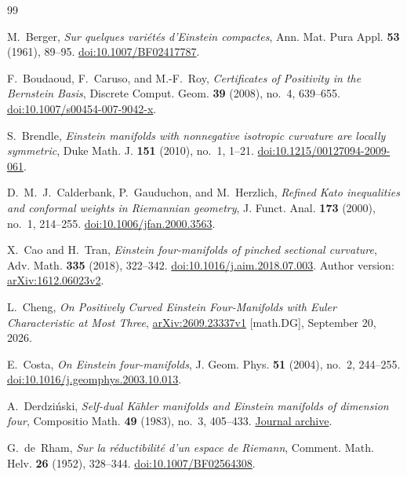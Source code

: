 \begin{thebibliography}{99}
\raggedright
{}

M.~Berger, \emph{Sur quelques vari\'et\'es d'Einstein compactes}, Ann. Mat. Pura Appl. \textbf{53} (1961), 89--95.
\href{https://doi.org/10.1007/BF02417787}{doi:10.1007/BF02417787}.

F.~Boudaoud, F.~Caruso, and M.-F.~Roy, \emph{Certificates of Positivity in the Bernstein Basis}, Discrete Comput. Geom. \textbf{39} (2008), no.~4, 639--655.
\href{https://doi.org/10.1007/s00454-007-9042-x}{doi:10.1007/s00454-007-9042-x}.

S.~Brendle, \emph{Einstein manifolds with nonnegative isotropic curvature are locally symmetric}, Duke Math. J. \textbf{151} (2010), no.~1, 1--21.
\href{https://doi.org/10.1215/00127094-2009-061}{doi:10.1215/00127094-2009-061}.

D.~M.~J.~Calderbank, P.~Gauduchon, and M.~Herzlich, \emph{Refined Kato inequalities and conformal weights in Riemannian geometry}, J. Funct. Anal. \textbf{173} (2000), no.~1, 214--255.
\href{https://doi.org/10.1006/jfan.2000.3563}{doi:10.1006/jfan.2000.3563}.

X.~Cao and H.~Tran, \emph{Einstein four-manifolds of pinched sectional curvature}, Adv. Math. \textbf{335} (2018), 322--342.
\href{https://doi.org/10.1016/j.aim.2018.07.003}{doi:10.1016/j.aim.2018.07.003}.
Author version: \href{https://arxiv.org/abs/1612.06023v2}{arXiv:1612.06023v2}.

L.~Cheng, \emph{On Positively Curved Einstein Four-Manifolds with Euler Characteristic at Most Three}, \href{https://arxiv.org/abs/2609.23337v1}{arXiv:2609.23337v1} [math.DG], September 20, 2026.

E.~Costa, \emph{On Einstein four-manifolds}, J. Geom. Phys. \textbf{51} (2004), no.~2, 244--255.
\href{https://doi.org/10.1016/j.geomphys.2003.10.013}{doi:10.1016/j.geomphys.2003.10.013}.

A.~Derdzi\'nski, \emph{Self-dual K\"ahler manifolds and Einstein manifolds of dimension four}, Compositio Math. \textbf{49} (1983), no.~3, 405--433. \href{https://www.numdam.org/item/CM_1983__49_3_405_0/}{Journal archive}.

G.~de~Rham, \emph{Sur la r\'eductibilit\'e d'un espace de Riemann},
Comment. Math. Helv. \textbf{26} (1952), 328--344.
\href{https://doi.org/10.1007/BF02564308}{doi:10.1007/BF02564308}.


\end{thebibliography}
